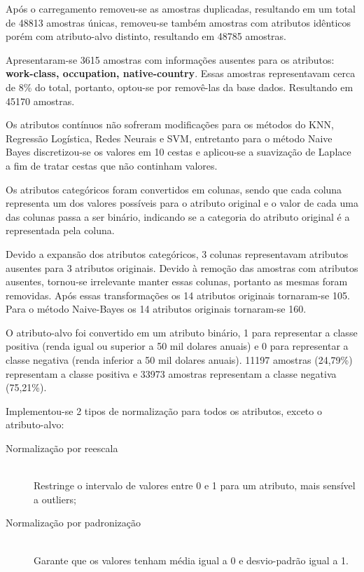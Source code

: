 Após o carregamento removeu-se as amostras duplicadas, resultando em um total de 48813 amostras únicas, removeu-se também amostras com atributos idênticos porém com atributo-alvo distinto, resultando em 48785 amostras.

Apresentaram-se 3615 amostras com informações ausentes para os atributos: \textbf{work-class, occupation, native-country}. Essas amostras representavam cerca de 8\% do total, portanto, optou-se por removê-las da base dados. Resultando em 45170 amostras.

Os atributos contínuos não sofreram modificações para os métodos do KNN, Regressão Logística, Redes Neurais e SVM, entretanto para o método Naive Bayes discretizou-se os valores em 10 cestas e aplicou-se a suavização de Laplace a fim de tratar cestas que não continham valores.

Os atributos categóricos foram convertidos em colunas, sendo que cada coluna representa um dos valores possíveis para o atributo original e o valor de cada uma das colunas passa a ser binário, indicando se a categoria do atributo original é a representada pela coluna.

Devido a expansão dos atributos categóricos, 3 colunas representavam atributos ausentes para 3 atributos originais. Devido à remoção das amostras com atributos ausentes, tornou-se irrelevante manter essas colunas, portanto as mesmas foram removidas. Após essas transformações os 14 atributos originais tornaram-se 105. Para o método Naive-Bayes os 14 atributos originais tornaram-se 160.

O atributo-alvo foi convertido em um atributo binário, 1 para representar a classe positiva (renda igual ou superior a 50 mil dolares anuais) e 0 para representar a classe negativa (renda inferior a 50 mil dolares anuais). 11197 amostras (24,79\%) representam a classe positiva e 33973 amostras representam a classe negativa (75,21\%).

Implementou-se 2 tipos de normalização para todos os atributos, exceto o atributo-alvo:

\begin{description}
\item[Normalização por reescala] \hfill \\ Restringe o intervalo de valores entre 0 e 1 para um atributo, mais sensível a outliers;
\item[Normalização por padronização] \hfill \\ Garante que os valores tenham média igual a 0 e desvio-padrão igual a 1.
\end{description}

